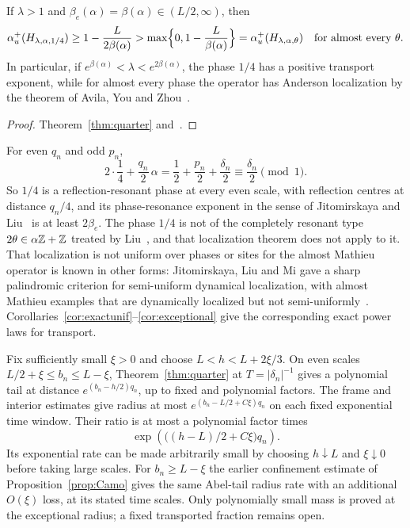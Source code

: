\begin{corollary}\label{cor:exceptional}
If $\lambda>1$ and $\beta_e(\alpha)=\beta(\alpha)\in(L/2,\infty)$, then
\[
\alpha_u^+(H_{\lambda,\alpha,1/4})\ge1-\frac L{2\beta(\alpha)}>\max\Bigl\{0,1-\frac L{\beta(\alpha)}\Bigr\}=\alpha_u^+(H_{\lambda,\alpha,\theta})\quad\text{for almost every }\theta .
\]
In particular, if $e^{\beta(\alpha)}<\lambda<e^{2\beta(\alpha)}$, the phase $1/4$ has a positive transport exponent, while for almost every phase the operator has Anderson localization by the theorem of Avila, You and Zhou~\cite{AYZ2017}.
\end{corollary}

\begin{proof}
Theorem~\ref{thm:quarter} and~\cite[Theorem~A]{DMamo}.
\end{proof}

\begin{remark}\label{rem:resonance}
For even $q_n$ and odd $p_n$,
\[
2\cdot\frac14+\frac{q_n}2\,\alpha=\frac12+\frac{p_n}2+\frac{\delta_n}2\equiv\frac{\delta_n}2\pmod1 .
\] So $1/4$ is a reflection-resonant phase at every even scale, with reflection centres at distance $q_n/4$, and its phase-resonance exponent in the sense of Jitomirskaya and Liu~\cite{JLphase} is at least $2\beta_e$. The phase $1/4$ is not of the completely resonant type $2\theta\in\alpha\mathbb Z+\mathbb Z$ treated by Liu~\cite[Theorem~1.1]{Liu2022}, and that localization theorem does not apply to it. That localization is not uniform over phases or sites for the almost Mathieu operator is known in other forms: Jitomirskaya, Liu and Mi gave a sharp palindromic criterion for semi-uniform dynamical localization, with almost Mathieu examples that are dynamically localized but not semi-uniformly~\cite{JLM2024}. Corollaries~\ref{cor:exactunif}--\ref{cor:exceptional} give the corresponding exact power laws for transport.
\end{remark}

\begin{remark}\label{rem:plateau}
Fix sufficiently small $\xi>0$ and choose $L<h<L+2\xi/3$.
On even scales $L/2+\xi\le b_n\le L-\xi$,
Theorem~\ref{thm:quarter} at $T=|\delta_n|^{-1}$ gives a polynomial
tail at distance $e^{(b_n-h/2)q_n}$, up to fixed and polynomial
factors. The frame and interior estimates give radius at most
$e^{(b_n-L/2+C\xi)q_n}$ on each fixed exponential time window.
Their ratio is at most a polynomial factor times
\[
 \exp\!\left(\bigl((h-L)/2+C\xi\bigr)q_n\right).
\]
Its exponential rate can be made arbitrarily small by choosing
$h\downarrow L$ and $\xi\downarrow0$ before taking large scales.
For $b_n\ge L-\xi$ the earlier confinement estimate of
Proposition~\ref{prop:Camo} gives the same Abel-tail radius rate
with an additional $O(\xi)$ loss, at its stated time scales.
Only polynomially small mass is proved at the exceptional radius;
a fixed transported fraction remains open.
\end{remark}

